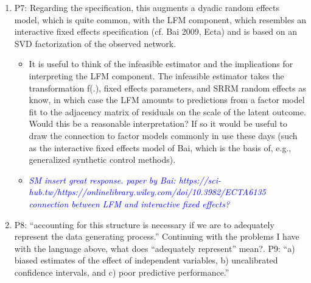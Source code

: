 \begin{enumerate}
\begin{itemize}
\end{itemize}
	\item P7: Regarding the specification, this augments a dyadic random effects model, which is quite common, with  the LFM component, which resembles an interactive fixed effects specification (cf. Bai 2009, Ecta) and is based on an SVD factorization of the observed network.
	\begin{itemize}
		\item It is useful to think of the infeasible estimator and the implications for interpreting the LFM component.  The infeasible estimator takes the transformation f(.), fixed effects parameters, and SRRM random effects as know, in which case the LFM amounts to predictions from a factor model fit to the adjacency matrix of residuals on the scale of the latent outcome.  Would this be a reasonable interpretation? If so it would be useful to draw the connection to factor models commonly in use these days (such as the interactive fixed effects model of Bai, which is the basis of, e.g., generalized synthetic control methods).
	\end{itemize}
	\begin{itemize}
		\item \textcolor{blue}{ \emph{
		SM insert great response.
		paper by Bai: https://sci-hub.tw/https://onlinelibrary.wiley.com/doi/10.3982/ECTA6135
		connection between LFM and interactive fixed effects?
		}}
	\end{itemize}
	\item P8: “accounting for this structure is necessary if we are to adequately represent the data generating process.” Continuing with the problems I have with the language above, what does “adequately represent” mean?. P9: “a) biased estimates of the effect of independent variables, b) uncalibrated confidence intervals, and c) poor predictive performance.”

\end{enumerate}
